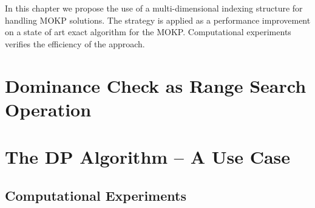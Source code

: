In this chapter we propose the use of a multi-dimensional
indexing structure for handling MOKP solutions.
The strategy is applied as a performance improvement
on a state of art exact algorithm for the MOKP.
Computational experiments verifies the efficiency of the approach.

\section{Dominance Check as Range Search Operation}
\label{sec:kdtree}


\section{The DP Algorithm -- A Use Case}


\subsection{Computational Experiments}

\label{sec:dynprogcomp}